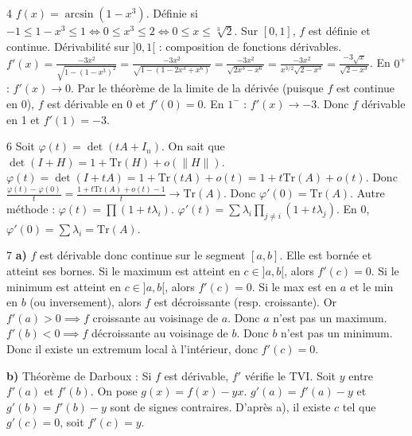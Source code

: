 \begin{correction}{4}
$f(x) = \arcsin(1-x^3)$. Définie si $-1 \le 1-x^3 \le 1 \iff 0 \le x^3 \le 2 \iff 0 \le x \le \sqrt[3]{2}$.
Sur $[0, 1]$, $f$ est définie et continue.
Dérivabilité sur $]0, 1[$ : composition de fonctions dérivables.
$f'(x) = \frac{-3x^2}{\sqrt{1-(1-x^3)^2}} = \frac{-3x^2}{\sqrt{1-(1-2x^3+x^6)}} = \frac{-3x^2}{\sqrt{2x^3-x^6}} = \frac{-3x^2}{x^{3/2}\sqrt{2-x^3}} = \frac{-3\sqrt{x}}{\sqrt{2-x^3}}$.
En $0^+$ : $f'(x) \to 0$. Par le théorème de la limite de la dérivée (puisque $f$ est continue en 0), $f$ est dérivable en 0 et $f'(0)=0$.
En $1^-$ : $f'(x) \to -3$. Donc $f$ dérivable en 1 et $f'(1)=-3$.
\end{correction}

\begin{correction}{6}
Soit $\varphi(t) = \det(tA+I_n)$.
On sait que $\det(I+H) = 1 + \text{Tr}(H) + o(\|H\|)$.
$\varphi(t) = \det(I+tA) = 1 + \text{Tr}(tA) + o(t) = 1 + t\text{Tr}(A) + o(t)$.
Donc $\frac{\varphi(t)-\varphi(0)}{t} = \frac{1+t\text{Tr}(A)+o(t)-1}{t} \to \text{Tr}(A)$.
Donc $\varphi'(0) = \text{Tr}(A)$.
Autre méthode : $\varphi(t) = \prod (1+t\lambda_i)$. $\varphi'(t) = \sum \lambda_i \prod_{j \ne i} (1+t\lambda_j)$.
En $0$, $\varphi'(0) = \sum \lambda_i = \text{Tr}(A)$.
\end{correction}

\begin{correction}{7}
\textbf{a)} $f$ est dérivable donc continue sur le segment $[a,b]$. Elle est bornée et atteint ses bornes.
Si le maximum est atteint en $c \in ]a,b[$, alors $f'(c)=0$.
Si le minimum est atteint en $c \in ]a,b[$, alors $f'(c)=0$.
Si le max est en $a$ et le min en $b$ (ou inversement), alors $f$ est décroissante (resp. croissante).
Or $f'(a)>0 \implies f$ croissante au voisinage de $a$. Donc $a$ n'est pas un maximum.
$f'(b)<0 \implies f$ décroissante au voisinage de $b$. Donc $b$ n'est pas un minimum.
Donc il existe un extremum local à l'intérieur, donc $f'(c)=0$.

\textbf{b)} Théorème de Darboux : Si $f$ est dérivable, $f'$ vérifie le TVI.
Soit $y$ entre $f'(a)$ et $f'(b)$. On pose $g(x) = f(x) - yx$.
$g'(a) = f'(a)-y$ et $g'(b)=f'(b)-y$ sont de signes contraires.
D'après a), il existe $c$ tel que $g'(c)=0$, soit $f'(c)=y$.
\end{correction}


